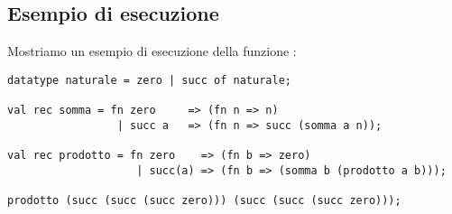 \subsection{Esempio di esecuzione}

Mostriamo un esempio di esecuzione della funzione :

\begin{lstlisting}[style = SML, caption={Esempio di esecuzione}]
datatype naturale = zero | succ of naturale;

val rec somma = fn zero		=> (fn n => n)
				 | succ a	=> (fn n => succ (somma a n));

val rec prodotto = fn zero	  => (fn b => zero)
					| succ(a) => (fn b => (somma b (prodotto a b)));

prodotto (succ (succ (succ zero))) (succ (succ (succ zero)));
\end{lstlisting}
